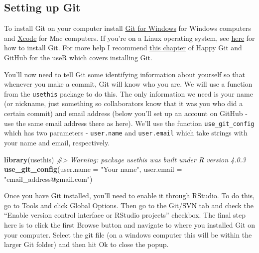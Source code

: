 \documentclass[
  12pt,
]{book}
\newenvironment{Shaded}{\begin{snugshade}}{\end{snugshade}}
\newcommand{\CommentTok}[1]{\textcolor[rgb]{0.37,0.37,0.37}{\textit{#1}}}
\newcommand{\DataTypeTok}[1]{\textcolor[rgb]{0.27,0.27,0.27}{#1}}
\newcommand{\KeywordTok}[1]{\textcolor[rgb]{0.27,0.27,0.27}{\textbf{#1}}}
\newcommand{\NormalTok}[1]{#1}
\newcommand{\StringTok}[1]{\textcolor[rgb]{0.5,0.5,0.5}{#1}}
\begin{document}
\hypertarget{setting-up-git}{%
\subsection{Setting up Git}\label{setting-up-git}}

To install Git on your computer install \href{https://gitforwindows.org/}{Git for Windows} for Windows computers and \href{https://git-scm.com/download/mac}{Xcode} for Mac computers. If you're on a Linux operating system, see \href{https://git-scm.com/download/linux}{here} for how to install Git. For more help I recommend \href{https://happygitwithr.com/install-git.html}{this chapter} of Happy Git and GitHub for the useR which covers installing Git.

You'll now need to tell Git some identifying information about yourself so that whenever you make a commit, Git will know who you are. We will use a function from the \texttt{usethis} package to do this. The only information we need is your name (or nickname, just something so collaborators know that it was you who did a certain commit) and email address (below you'll set up an account on GitHub - use the same email address there as here). We'll use the function \texttt{use\_git\_config} which has two parameters - \texttt{user.name} and \texttt{user.email} which take strings with your name and email, respectively.

\begin{Shaded}
\begin{Highlighting}[]
\KeywordTok{library}\NormalTok{(usethis)}
\CommentTok{\#\textgreater{} Warning: package \textquotesingle{}usethis\textquotesingle{} was built under R version 4.0.3}
\KeywordTok{use\_git\_config}\NormalTok{(}\DataTypeTok{user.name =} \StringTok{"Your name"}\NormalTok{, }\DataTypeTok{user.email =} \StringTok{"email\_address@gmail.com"}\NormalTok{)}
\end{Highlighting}
\end{Shaded}

Once you have Git installed, you'll need to enable it through RStudio. To do this, go to Tools and click Global Options. Then go to the Git/SVN tab and check the ``Enable version control interface or RStudio projects'' checkbox. The final step here is to click the first Browse button and navigate to where you installed Git on your computer. Select the git file (on a windows computer this will be within the larger Git folder) and then hit Ok to close the popup.
\end{document}

